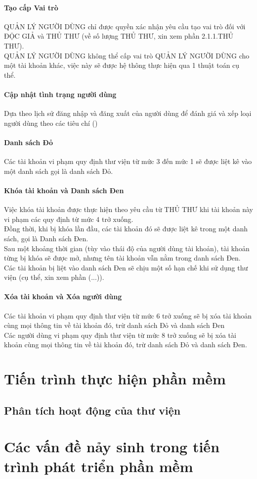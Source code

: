 \documentclass[12pt,a4paper]{report}
\begin{document}
			\subsubsection{Tạo cấp Vai trò}
			QUẢN LÝ NGƯỜI DÙNG chỉ được quyền xác nhận yêu cầu tạo vai trò đối với ĐỘC GIẢ và THỦ THƯ (về số lượng THỦ THƯ, xin xem phần 2.1.1.THỦ THƯ).\\
			QUẢN LÝ NGƯỜI DÙNG không thể cấp vai trò QUẢN LÝ NGƯỜI DÙNG cho một tài khoản khác, việc này sẽ được hệ thông thực hiện qua 1 thuật toán cụ thể.\\

			\subsubsection{Cập nhật tình trạng người dùng}
			Dựa theo lịch sử đăng nhập và đăng xuất của người dùng để đánh giá và xếp loại người dùng theo các tiêu chí ()\\ %

			\subsubsection{Danh sách Đỏ}
			Các tài khoản vi phạm quy định thư viện từ mức 3 đến mức 1 sẽ được liệt kê vào một danh sách gọi là danh sách Đỏ.\\

			\subsubsection{Khóa tài khoản và Danh sách Đen}
			Việc khóa tài khoản được thực hiện theo yêu cầu từ THỦ THƯ khi tài khoản này vi phạm các quy định từ mức 4 trở xuống.\\
			Đồng thời, khi bị khóa lần đầu, các tài khoản đó sẽ được liệt kê trong một danh sách, gọi là Danh sách Đen.\\
			Sau một khoảng thời gian (tùy vào thái độ của người dùng tài khoản), tài khoản từng bị khóa sẽ được mở, nhưng tên tài khoản vẫn nằm trong danh sách Đen.\\
			Các tài khoản bị liệt vào danh sách Đen sẽ chịu một số hạn chế khi sử dụng thư viện (cụ thể, xin xem phần (...)).\\

			\subsubsection{Xóa tài khoản và Xóa người dùng}
			Các tài khoản vi phạm quy định thư viện từ mức 6 trở xuống sẽ bị xóa tài khoản cùng mọi thông tin về tài khoản đó, trừ danh sách Đỏ và danh sách Đen\\
			Các người dùng vi phạm quy định thư viện từ mức 8 trở xuống sẽ bị xóa tài khoản cùng mọi thông tin về tài khoản đó, trừ danh sách Đỏ và danh sách Đen.\\
\chapter{Tiến trình thực hiện phần mềm}
	\section{Phân tích hoạt động của thư viện}
\chapter{Các vấn đề nảy sinh trong tiến trình phát triển phần mềm}
\end{document}

